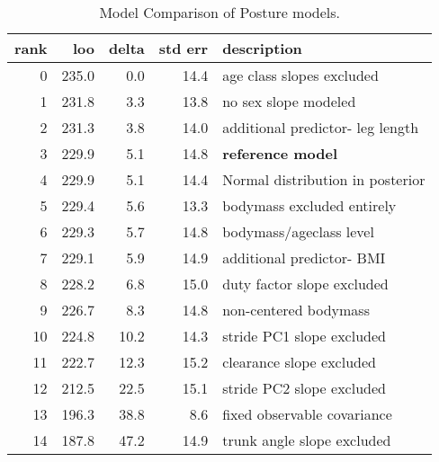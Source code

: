 \begin{table}[htbp]
\caption{\label{tab:posturemodelcomparison}Model Comparison of Posture models.}
\centering
\begin{tabular}{rrrrl}
\textbf{rank} & \textbf{loo} & \textbf{delta} & \textbf{std err} & \textbf{description}\\[0pt]
\hline
0 & 235.0 & 0.0 & 14.4 & age class slopes excluded\\[0pt]
1 & 231.8 & 3.3 & 13.8 & no sex slope modeled\\[0pt]
2 & 231.3 & 3.8 & 14.0 & additional predictor- leg length\\[0pt]
3 & 229.9 & 5.1 & 14.8 & \textbf{reference model}\\[0pt]
4 & 229.9 & 5.1 & 14.4 & Normal distribution in posterior\\[0pt]
5 & 229.4 & 5.6 & 13.3 & bodymass excluded entirely\\[0pt]
6 & 229.3 & 5.7 & 14.8 & bodymass/ageclass level\\[0pt]
7 & 229.1 & 5.9 & 14.9 & additional predictor- BMI\\[0pt]
8 & 228.2 & 6.8 & 15.0 & duty factor slope excluded\\[0pt]
9 & 226.7 & 8.3 & 14.8 & non-centered bodymass\\[0pt]
10 & 224.8 & 10.2 & 14.3 & stride PC1 slope excluded\\[0pt]
11 & 222.7 & 12.3 & 15.2 & clearance slope excluded\\[0pt]
12 & 212.5 & 22.5 & 15.1 & stride PC2 slope excluded\\[0pt]
13 & 196.3 & 38.8 & 8.6 & fixed observable covariance\\[0pt]
14 & 187.8 & 47.2 & 14.9 & trunk angle slope excluded\\[0pt]
\end{tabular}
\end{table}

